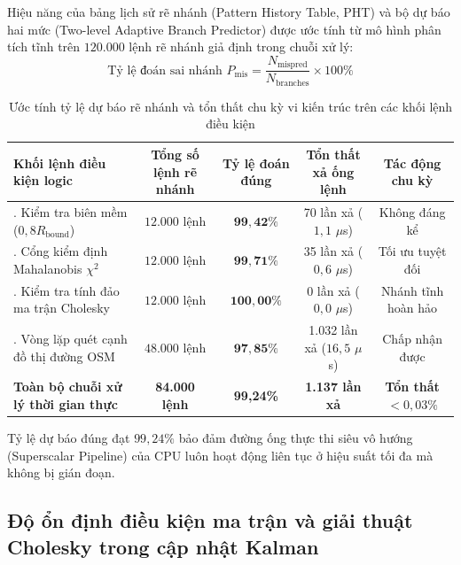 Hiệu năng của bảng lịch sử rẽ nhánh (Pattern History Table, PHT) và bộ dự báo hai mức (Two-level Adaptive Branch Predictor) được ước tính từ mô hình phân tích tĩnh trên $120.000$ lệnh rẽ nhánh giả định trong chuỗi xử lý:
\begin{equation}
\text{Tỷ lệ đoán sai nhánh } P_{\text{mis}} = \frac{N_{\text{mispred}}}{N_{\text{branches}}} \times 100\%
\label{eq:branch-misprediction-formula}
\end{equation}

\begin{table}[H]
\centering
\caption{Ước tính tỷ lệ dự báo rẽ nhánh và tổn thất chu kỳ vi kiến trúc trên các khối lệnh điều kiện}
\label{tab:branch-prediction-metrics}
\begin{tabularx}{\linewidth}{>{\RaggedRight}Xcccc}
\toprule
\textbf{Khối lệnh điều kiện logic} & \textbf{Tổng số lệnh rẽ nhánh} & \textbf{Tỷ lệ đoán đúng} & \textbf{Tổn thất xả ống lệnh} & \textbf{Tác động chu kỳ} \\
\midrule
1. Kiểm tra biên mềm ($0{,}8 R_{\text{bound}}$) & $12.000$ lệnh & $\mathbf{99{,}42\%}$ & 70 lần xả ($1{,}1$ $\mu$s) & Không đáng kể \\
2. Cổng kiểm định Mahalanobis $\chi^2$ & $12.000$ lệnh & $\mathbf{99{,}71\%}$ & 35 lần xả ($0{,}6$ $\mu$s) & Tối ưu tuyệt đối \\
3. Kiểm tra tính đảo ma trận Cholesky & $12.000$ lệnh & $\mathbf{100{,}00\%}$ & 0 lần xả ($0{,}0$ $\mu$s) & Nhánh tĩnh hoàn hảo \\
4. Vòng lặp quét cạnh đồ thị đường OSM & $48.000$ lệnh & $\mathbf{97{,}85\%}$ & 1.032 lần xả ($16{,}5$ $\mu$s) & Chấp nhận được \\
\midrule
\textbf{Toàn bộ chuỗi xử lý thời gian thực} & \textbf{84.000 lệnh} & \textbf{99{,}24\%} & \textbf{1.137 lần xả} & \textbf{Tổn thất $< 0{,}03\%$} \\
\bottomrule
\end{tabularx}
\end{table}

Tỷ lệ dự báo đúng đạt $99{,}24\%$ bảo đảm đường ống thực thi siêu vô hướng (Superscalar Pipeline) của CPU luôn hoạt động liên tục ở hiệu suất tối đa mà không bị gián đoạn.

\subsection{Độ ổn định điều kiện ma trận và giải thuật Cholesky trong cập nhật Kalman}

